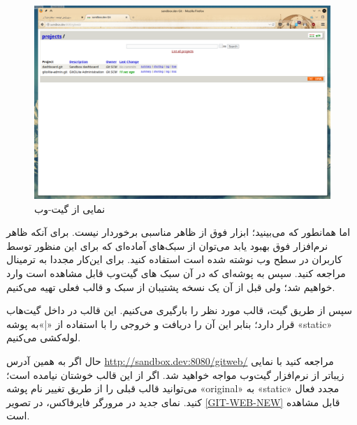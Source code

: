 \begin{figure}
    \includegraphics[width=.9\textwidth ,height=.65\textwidth]{Pic/GIT-WEB}
    \caption{ نمایی از گیت-وب 
    }
    \label{GIT-WEB}
\end{figure}

اما همانطور که می‌بینید؛ ابزار فوق از ظاهر مناسبی برخوردار نیست. برای آنکه ظاهر نرم‌افزار فوق بهبود یابد می‌توان از سبک‌های آماده‌ای که برای این منظور توسط کاربران در سطح وب نوشته شده است استفاده کنید. برای این‌کار مجددا به ترمینال مراجعه کنید. سپس به پوشه‌ای که در آن سبک های گیت‌وب قابل مشاهده است وارد خواهیم شد؛ ولی قبل از آن یک نسخه پشتیبان از سبک  و قالب فعلی تهیه می‌کنیم. 
\newline

\begin{latin}  
    
\end{latin}

سپس از طریق گیت، قالب مورد نظر را بارگیری می‌کنیم. این قالب در داخل گیت‌هاب قرار دارد؛ بنابر این آن را دریافت و  خروجی را با استفاده از «|»به پوشه «static» لوله‌کشی می‌کنیم.
\newline

\begin{latin}  
    
\end{latin}

حال اگر به همین آدرس 
\url{http://sandbox.dev:8080/gitweb/}
 مراجعه کنید با نمایی زیباتر از نرم‌افزار گیت‌وب مواجه خواهید شد. اگر از این قالب خوشتان نیامده است؛ می‌توانید قالب قبلی را از طریق تغییر نام پوشه «original» به «static» مجدد فعال کنید. نمای جدید در مرورگر فایرفاکس، در تصویر \ref{GIT-WEB-NEW} قابل مشاهده است.
 
